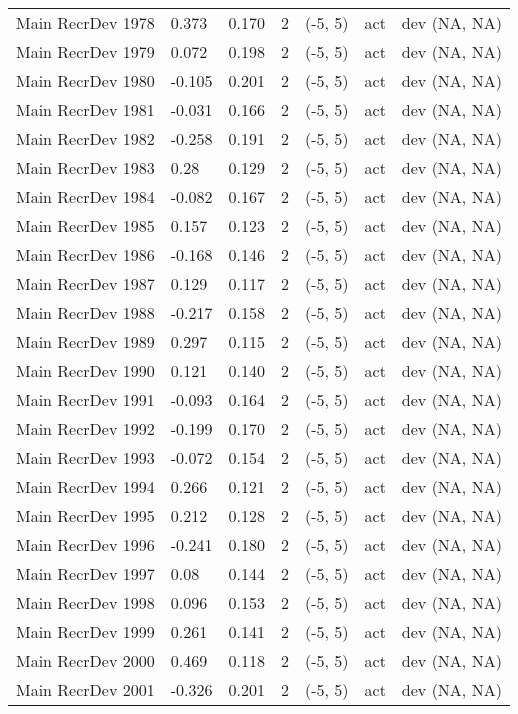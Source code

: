 \documentclass[11pt,
  english,
  letterpaper,
]{article}
\begin{document}
\begin{landscape}
\begin{longtable}[t]{>{\raggedright\arraybackslash}p{7.5cm}lllll>{\raggedright\arraybackslash}p{3.5cm}}
Main RecrDev 1978 & 0.373 & 0.170 & 2 & (-5, 5) & act & dev (NA, NA)\\
Main RecrDev 1979 & 0.072 & 0.198 & 2 & (-5, 5) & act & dev (NA, NA)\\
Main RecrDev 1980 & -0.105 & 0.201 & 2 & (-5, 5) & act & dev (NA, NA)\\
Main RecrDev 1981 & -0.031 & 0.166 & 2 & (-5, 5) & act & dev (NA, NA)\\
Main RecrDev 1982 & -0.258 & 0.191 & 2 & (-5, 5) & act & dev (NA, NA)\\
Main RecrDev 1983 & 0.28 & 0.129 & 2 & (-5, 5) & act & dev (NA, NA)\\
Main RecrDev 1984 & -0.082 & 0.167 & 2 & (-5, 5) & act & dev (NA, NA)\\
Main RecrDev 1985 & 0.157 & 0.123 & 2 & (-5, 5) & act & dev (NA, NA)\\
Main RecrDev 1986 & -0.168 & 0.146 & 2 & (-5, 5) & act & dev (NA, NA)\\
Main RecrDev 1987 & 0.129 & 0.117 & 2 & (-5, 5) & act & dev (NA, NA)\\
Main RecrDev 1988 & -0.217 & 0.158 & 2 & (-5, 5) & act & dev (NA, NA)\\
Main RecrDev 1989 & 0.297 & 0.115 & 2 & (-5, 5) & act & dev (NA, NA)\\
Main RecrDev 1990 & 0.121 & 0.140 & 2 & (-5, 5) & act & dev (NA, NA)\\
Main RecrDev 1991 & -0.093 & 0.164 & 2 & (-5, 5) & act & dev (NA, NA)\\
Main RecrDev 1992 & -0.199 & 0.170 & 2 & (-5, 5) & act & dev (NA, NA)\\
Main RecrDev 1993 & -0.072 & 0.154 & 2 & (-5, 5) & act & dev (NA, NA)\\
Main RecrDev 1994 & 0.266 & 0.121 & 2 & (-5, 5) & act & dev (NA, NA)\\
Main RecrDev 1995 & 0.212 & 0.128 & 2 & (-5, 5) & act & dev (NA, NA)\\
Main RecrDev 1996 & -0.241 & 0.180 & 2 & (-5, 5) & act & dev (NA, NA)\\
Main RecrDev 1997 & 0.08 & 0.144 & 2 & (-5, 5) & act & dev (NA, NA)\\
Main RecrDev 1998 & 0.096 & 0.153 & 2 & (-5, 5) & act & dev (NA, NA)\\
Main RecrDev 1999 & 0.261 & 0.141 & 2 & (-5, 5) & act & dev (NA, NA)\\
Main RecrDev 2000 & 0.469 & 0.118 & 2 & (-5, 5) & act & dev (NA, NA)\\
Main RecrDev 2001 & -0.326 & 0.201 & 2 & (-5, 5) & act & dev (NA, NA)\\

\end{longtable}
\end{landscape}
\end{document}
